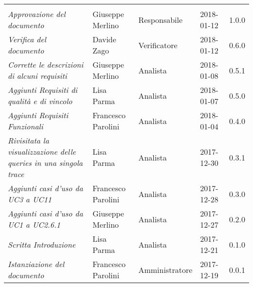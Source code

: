 \newpage 
\section*{}
\begin{table}[H]
	\centering
	\begin{tabular}{p{4cm}|C{3cm}|C{3cm}|R{2.5cm}|R{2cm}}
		
		 & & & & \\
		
		
		\emph{Approvazione del documento}& Giuseppe Merlino & Responsabile & 2018-01-12 & 1.0.0 \\
		\hline
		
		\emph{Verifica del documento}& Davide Zago & Verificatore & 2018-01-12 & 0.6.0 \\
		\hline
		
		\emph{Corrette le descrizioni di alcuni requisiti}& Giuseppe Merlino & Analista & 2018-01-08 & 0.5.1 \\
		\hline
		
		\emph{Aggiunti Requisiti di qualità e di vincolo}& Lisa Parma & Analista & 2018-01-07 & 0.5.0 \\
		\hline
		
		\emph{Aggiunti Requisiti Funzionali}& Francesco Parolini & Analista & 2018-01-04 & 0.4.0 \\
		\hline
		
		\emph{Rivisitata la visualizzazione delle queries in una singola trace}& Lisa Parma & Analista & 2017-12-30 & 0.3.1 \\
		\hline
		
		\emph{Aggiunti casi d'uso da UC3 a UC11}& Francesco Parolini & Analista & 2017-12-28 & 0.3.0 \\
		\hline
		
		\emph{Aggiunti casi d'uso da UC1 a UC2.6.1}& Giuseppe Merlino & Analista & 2017-12-27 & 0.2.0 \\
		\hline
		
		\emph{Scritta Introduzione}& Lisa Parma & Analista & 2017-12-21 & 0.1.0 \\
		\hline
		
		\emph{Istanziazione del documento}& Francesco Parolini & Amministratore & 2017-12-19 & 0.0.1 \\
		\hline
		
	\end{tabular}
	
\end{table}


\clearpage